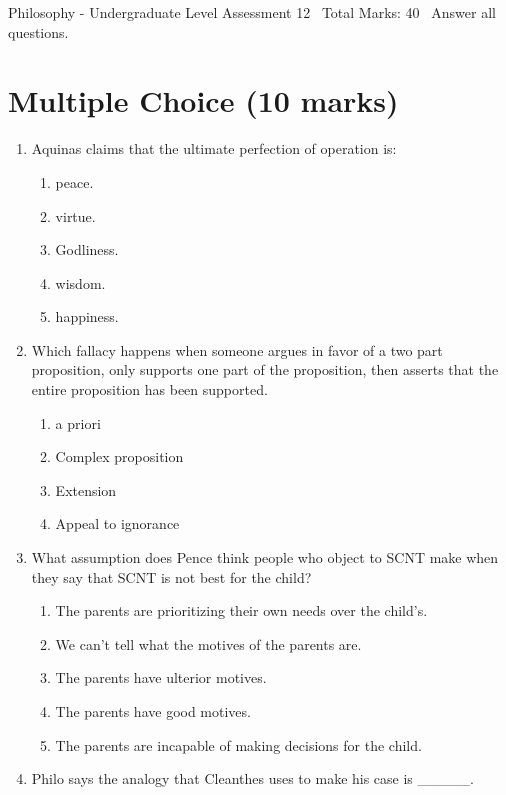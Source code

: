 \documentclass[12pt]{article}
\begin{document}
\begin{center}
Philosophy - Undergraduate Level Assessment 12 \
Total Marks: 40 \
Answer all questions.
\end{center}

\section*{Multiple Choice (10 marks)}
\begin{enumerate}[label=\arabic*.]
\item Aquinas claims that the ultimate perfection of operation is:
\begin{enumerate}[label=(\alph*)]
    \item peace.
    \item virtue.
    \item Godliness.
    \item wisdom.
    \item happiness.
\end{enumerate}
\item Which fallacy happens when someone argues in favor of a two part proposition, only supports one part of the proposition, then asserts that the entire proposition has been supported.
\begin{enumerate}[label=(\alph*)]
    \item a priori
    \item Complex proposition
    \item Extension
    \item Appeal to ignorance
\end{enumerate}
\item What assumption does Pence think people who object to SCNT make when they say that SCNT is not best for the child?
\begin{enumerate}[label=(\alph*)]
    \item The parents are prioritizing their own needs over the child's.
    \item We can't tell what the motives of the parents are.
    \item The parents have ulterior motives.
    \item The parents have good motives.
    \item The parents are incapable of making decisions for the child.
\end{enumerate}
\item Philo says the analogy that Cleanthes uses to make his case is \_\_\_\_\_.
\begin{enumerate}[label=(\alph*)]

\end{enumerate}
\end{enumerate}
\end{document}
